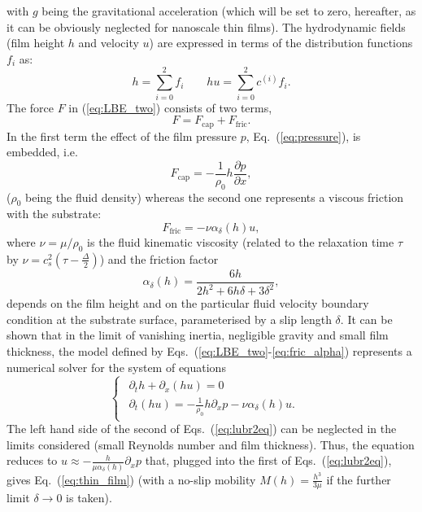 with $g$ being the gravitational acceleration (which will be 
set to zero, hereafter, as it can be obviously neglected for nanoscale thin films).
The hydrodynamic fields (film height $h$ and velocity $u$) are expressed in terms of the 
distribution functions $f_i$ as:
\begin{equation}\label{eq:hydrofields}
h= \sum_{i=0}^2 f_i \qquad hu = \sum_{i=0}^2 c^{(i)} f_i.
\end{equation}
The force $F$ in (\ref{eq:LBE_two}) consists of two terms,
\begin{equation}\label{eq:force_two}
F = F_{\text{cap}} + F_{\text{fric}}.  
\end{equation}
In the first term the effect of the film pressure $p$, Eq.~(\ref{eq:pressure}), is 
embedded, i.e. 
\begin{equation}\label{eq:capillary_force}
    F_{\text{cap}} = -\frac{1}{\rho_0} h \frac{\partial p}{\partial x},
\end{equation}
($\rho_0$ being the fluid density) whereas the second one represents a viscous friction with the substrate:
\begin{equation}\label{eq:fric_force}
    F_{\text{fric}} = -\nu \alpha_{\delta}(h) u,
\end{equation}
where $\nu=\mu/\rho_0$ is the fluid kinematic viscosity (related to the relaxation time $\tau$ by $\nu = c_s^2\left(\tau-\frac{\Delta}{2}\right)$) and the friction factor
\begin{equation}\label{eq:fric_alpha}
     \alpha_{\delta}(h) = \frac{6 h}{2h^2 + 6h\delta + 3\delta^2},
\end{equation}
depends on the film height and on the particular fluid velocity boundary 
condition at the substrate surface, parameterised by a slip length $\delta$.
It can be shown that in the limit of vanishing inertia, negligible gravity and small film thickness, the model defined by Eqs.~(\ref{eq:LBE_two}-\ref{eq:fric_alpha})
represents a numerical solver for the system of equations
\begin{equation}\label{eq:lubr2eq}
\begin{cases}
\begin{array}{ll}
\partial_t h + \partial_x (h u)  = 0 & \\ 
\partial_t (h u) = -\frac{1}{\rho_0}h\partial_x p -\nu\alpha_{\delta}(h)u.
\end{array}
\end{cases}
\end{equation}
The left hand side of the second of Eqs.~(\ref{eq:lubr2eq}) can be neglected in the limits considered (small Reynolds number and film thickness). Thus, 
the equation reduces to $u \approx -\frac{h}{\mu\alpha_{\delta}(h)}\partial_x p$ that, plugged into the first of Eqs.~(\ref{eq:lubr2eq}), gives Eq.~(\ref{eq:thin_film}) 
(with a no-slip mobility $M(h)=\frac{h^3}{3\mu}$ if the further limit $\delta \rightarrow 0$ is taken).

